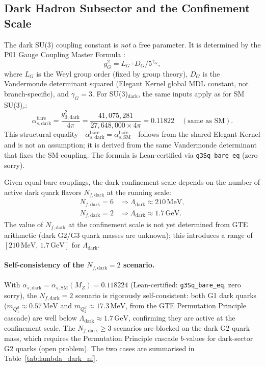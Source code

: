 \documentclass[11pt]{article}
\begin{document}
\subsection{Dark Hadron Subsector and the Confinement Scale}
\label{ssec:hadrons}

The dark SU(3) coupling constant is \emph{not} a free parameter. It is determined by
the P01 Gauge Coupling Master Formula \cite{Spivack2025_FirstPrinciplesSM}:
\begin{equation}
g_G^2 = L_G \cdot D_G / 5^{\gamma_G},
\label{eq:gauge_master}
\end{equation}
where $L_G$ is the Weyl group order (fixed by group theory), $D_G$ is the Vandermonde
determinant squared (Elegant Kernel global MDL constant, not branch-specific), and
$\gamma_G = 3$. For SU(3)$_\mathrm{dark}$, the same inputs apply as for SM SU(3)$_c$:
\begin{equation}
\alpha_{s,\mathrm{dark}}^\mathrm{bare} = \frac{g_{3,\mathrm{dark}}^2}{4\pi}
= \frac{41{,}075{,}281}{27{,}648{,}000 \times 4\pi}
= 0.11822 \quad (\text{same as SM}).
\label{eq:alpha_dark}
\end{equation}
This structural equality---$\alpha_{s,\mathrm{dark}}^\mathrm{bare} = \alpha_{s,\mathrm{SM}}^\mathrm{bare}$---follows
from the shared Elegant Kernel and is not an assumption; it is derived from the same
Vandermonde determinant that fixes the SM coupling. The formula is Lean-certified via
\texttt{g3Sq\_bare\_eq} (zero sorry).

Given equal bare couplings, the dark confinement scale depends on the number of active
dark quark flavors $N_{f,\mathrm{dark}}$ at the running scale:
\begin{align}
N_{f,\mathrm{dark}} = 6 &\Rightarrow \Lambda_\mathrm{dark} \approx 210\,\mathrm{MeV}, \label{eq:lambda_dark_nf6}\\
N_{f,\mathrm{dark}} = 2 &\Rightarrow \Lambda_\mathrm{dark} \approx 1.7\,\mathrm{GeV}. \label{eq:lambda_dark_nf2}
\end{align}
The value of $N_{f,\mathrm{dark}}$ at the confinement scale is not yet determined from
GTE arithmetic (dark G2/G3 quark masses are unknown); this introduces a range of
$[210\,\mathrm{MeV},\, 1.7\,\mathrm{GeV}]$ for $\Lambda_\mathrm{dark}$.

\paragraph{Self-consistency of the $N_{f,\mathrm{dark}}=2$ scenario.}
With $\alpha_{s,\mathrm{dark}} = \alpha_{s,\mathrm{SM}}(M_Z) = 0.118224$ (Lean-certified:
\texttt{g3Sq\_bare\_eq}, zero sorry), the $N_{f,\mathrm{dark}}=2$ scenario is rigorously
self-consistent: both G1 dark quarks ($m_{Q_1^d} \approx 0.57\,\mathrm{MeV}$ and
$m_{Q_2^d} \approx 17.3\,\mathrm{MeV}$, from the GTE Permutation Principle cascade)
are well below $\Lambda_\mathrm{dark} \approx 1.7\,\mathrm{GeV}$, confirming they are
active at the confinement scale.  The $N_{f,\mathrm{dark}} \geq 3$ scenarios are blocked
on the dark G2 quark mass, which requires the Permutation Principle cascade $b$-values
for dark-sector G2 quarks (open problem).  The two cases are summarised in
Table~\ref{tab:lambda_dark_nf}.
\end{document}
